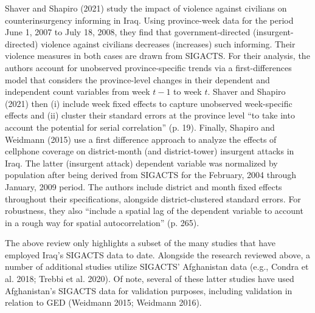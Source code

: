 \documentclass[12pt]{article}
\begin{document}
Shaver and Shapiro (2021) study the impact of violence against civilians on counterinsurgency informing in Iraq. Using province-week data for the period June 1, 2007 to July 18, 2008, they find that government-directed (insurgent-directed) violence against civilians decreases (increases) such informing. Their violence measures in both cases are drawn from SIGACTS. For their analysis, the authors account for unobserved province-specific trends via a first-differences model that considers the province-level changes in their dependent and independent count variables from week $t-1$ to week $t$. Shaver and Shapiro (2021) then (i) include week fixed effects to capture unobserved week-specific effects and (ii) cluster their standard errors at the province level ``to take into account the potential for serial correlation'' (p. 19). Finally, Shapiro and Weidmann (2015) use a first difference approach to analyze the effects of cellphone coverage on district-month (and district-tower) insurgent attacks in Iraq. The latter (insurgent attack) dependent variable was normalized by population after being derived from SIGACTS for the February, 2004 through January, 2009 period. The authors include district and month fixed effects throughout their specifications, alongside district-clustered standard errors. For robustness, they also ``include a spatial lag of the dependent variable to account in a rough way for spatial autocorrelation'' (p. 265).

The above review only highlights a subset of the many studies that have employed Iraq's SIGACTS data to date. Alongside the research reviewed above, a number of additional studies utilize SIGACTS' Afghanistan data (e.g., Condra et al. 2018; Trebbi et al. 2020). Of note, several of these latter studies have used Afghanistan's SIGACTS data for validation purposes, including validation in relation to GED (Weidmann 2015; Weidmann 2016).



\end{document}
